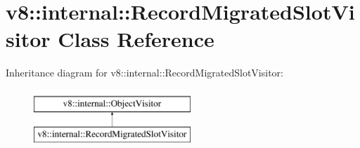 \hypertarget{classv8_1_1internal_1_1RecordMigratedSlotVisitor}{}\section{v8\+:\+:internal\+:\+:Record\+Migrated\+Slot\+Visitor Class Reference}
\label{classv8_1_1internal_1_1RecordMigratedSlotVisitor}
Inheritance diagram for v8\+:\+:internal\+:\+:Record\+Migrated\+Slot\+Visitor\+:\begin{figure}[H]
\begin{center}
\leavevmode
\includegraphics[height=2.000000cm]{classv8_1_1internal_1_1RecordMigratedSlotVisitor}
\end{center}
\end{figure}
